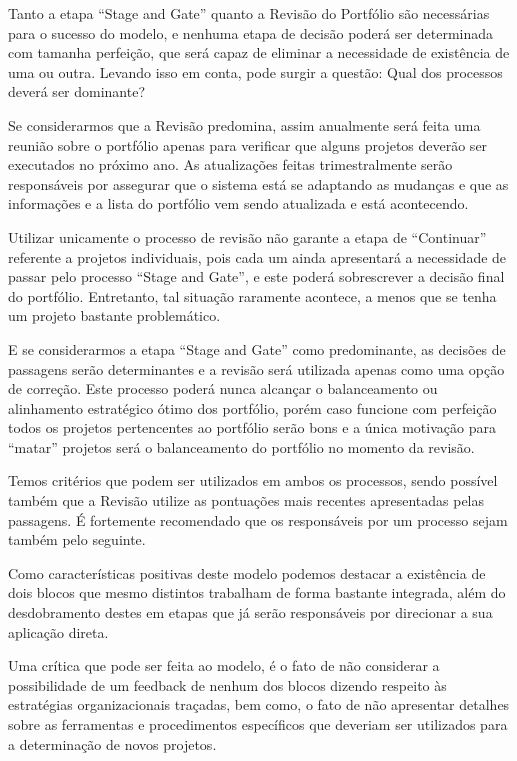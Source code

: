 \documentclass[12pt,a4paper,ruledheader,tocpage=prefix,floatnumber=continuous,pagestart=folhaderosto,font=times]{abnt}
\begin{document}
Tanto a etapa ``Stage and Gate'' quanto a Revisão do Portfólio são necessárias para o sucesso do modelo, e nenhuma etapa de decisão poderá ser determinada
com tamanha perfeição, que será capaz de eliminar a necessidade de existência de uma ou outra. Levando isso em conta, pode surgir a questão: Qual dos 
processos deverá ser dominante?

Se considerarmos que a Revisão predomina, assim anualmente será feita uma reunião sobre o portfólio apenas para verificar que alguns projetos deverão
ser executados no próximo ano. As atualizações feitas trimestralmente serão responsáveis por assegurar que o sistema está se adaptando as mudanças
e que as informações e a lista do portfólio vem sendo atualizada e está acontecendo. 

Utilizar unicamente o processo de revisão não garante a etapa de ``Continuar'' referente a projetos individuais, pois cada um ainda apresentará a 
necessidade de passar pelo processo ``Stage and Gate'', e este poderá sobrescrever a decisão final do portfólio. Entretanto, tal situação raramente 
acontece, a menos que se tenha um projeto bastante problemático.

E se considerarmos a etapa ``Stage and Gate'' como predominante, as decisões de passagens serão determinantes e a revisão será utilizada apenas como
uma opção de correção. Este processo poderá nunca alcançar o balanceamento ou alinhamento estratégico ótimo dos portfólio, porém caso funcione com perfeição
todos os projetos pertencentes ao portfólio serão bons e a única motivação para ``matar'' projetos será o balanceamento do portfólio no momento da 
revisão.

Temos critérios que podem ser utilizados em ambos os processos, sendo possível também que a Revisão utilize as pontuações mais recentes apresentadas pelas 
passagens. É fortemente recomendado que os responsáveis por um processo sejam também pelo seguinte.

Como características positivas deste modelo podemos destacar a existência de dois blocos que mesmo distintos trabalham de forma bastante integrada, 
além do desdobramento destes em etapas que já serão responsáveis por direcionar a sua aplicação direta.

Uma crítica que pode ser feita ao modelo, é o fato de não considerar a possibilidade de um feedback de nenhum dos blocos dizendo respeito às estratégias
organizacionais traçadas, bem como, o fato de não apresentar detalhes sobre as ferramentas e procedimentos específicos que deveriam ser utilizados
para a determinação de novos projetos.
\end{document}
